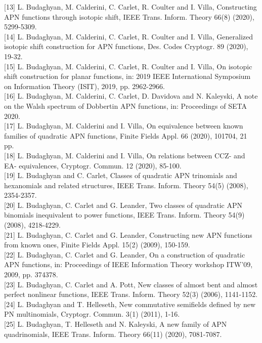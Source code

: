 \documentclass[10pt]{article}
\begin{document}
[13] L. Budaghyan, M. Calderini, C. Carlet, R. Coulter and I. Villa, Constructing APN functions through isotopic shift, IEEE Trans. Inform. Theory 66(8) (2020), 5299-5309.\\[0pt]
[14] L. Budaghyan, M. Calderini, C. Carlet, R. Coulter and I. Villa, Generalized isotopic shift construction for APN functions, Des. Codes Cryptogr. 89 (2020), 19-32.\\[0pt]
[15] L. Budaghyan, M. Calderini, C. Carlet, R. Coulter and I. Villa, On isotopic shift construction for planar functions, in: 2019 IEEE International Symposium on Information Theory (ISIT), 2019, pp. 2962-2966.\\[0pt]
[16] L. Budaghyan, M. Calderini, C. Carlet, D. Davidova and N. Kaleyski, A note on the Walsh spectrum of Dobbertin APN functions, in: Proceedings of SETA 2020.\\[0pt]
[17] L. Budaghyan, M. Calderini and I. Villa, On equivalence between known families of quadratic APN functions, Finite Fields Appl. 66 (2020), 101704, 21 pp.\\[0pt]
[18] L. Budaghyan, M. Calderini and I. Villa, On relations between CCZ- and EA- equivalences, Cryptogr. Commun. 12 (2020), 85-100.\\[0pt]
[19] L. Budaghyan and C. Carlet, Classes of quadratic APN trinomials and hexanomials and related structures, IEEE Trans. Inform. Theory 54(5) (2008), 2354-2357.\\[0pt]
[20] L. Budaghyan, C. Carlet and G. Leander, Two classes of quadratic APN binomials inequivalent to power functions, IEEE Trans. Inform. Theory 54(9) (2008), 4218-4229.\\[0pt]
[21] L. Budaghyan, C. Carlet and G. Leander, Constructing new APN functions from known ones, Finite Fields Appl. 15(2) (2009), 150-159.\\[0pt]
[22] L. Budaghyan, C. Carlet and G. Leander, On a construction of quadratic APN functions, in: Proceedings of IEEE Information Theory workshop ITW'09, 2009, pp. 374378.\\[0pt]
[23] L. Budaghyan, C. Carlet and A. Pott, New classes of almost bent and almost perfect nonlinear functions, IEEE Trans. Inform. Theory 52(3) (2006), 1141-1152.\\[0pt]
[24] L. Budaghyan and T. Helleseth, New commutative semifields defined by new PN multinomials, Cryptogr. Commun. 3(1) (2011), 1-16.\\[0pt]
[25] L. Budaghyan, T. Helleseth and N. Kaleyski, A new family of APN quadrinomials, IEEE Trans. Inform. Theory 66(11) (2020), 7081-7087.\\[0pt]
\end{document}
